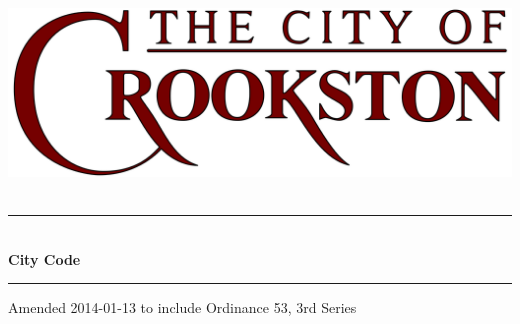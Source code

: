 \begin{titlepage}
\begin{center}

~\\[3cm]
\includegraphics[width=.75\textwidth]{./images/crookston_logo.png}~\\[2.5cm]

\hrule ~\\[0.4cm]
{\Huge\bfseries City Code}\\[0.4cm]
\hrule

\vfill

{\large Amended 2014-01-13 to include}
{\large Ordinance 53, 3rd Series}

\end{center}
\end{titlepage}
